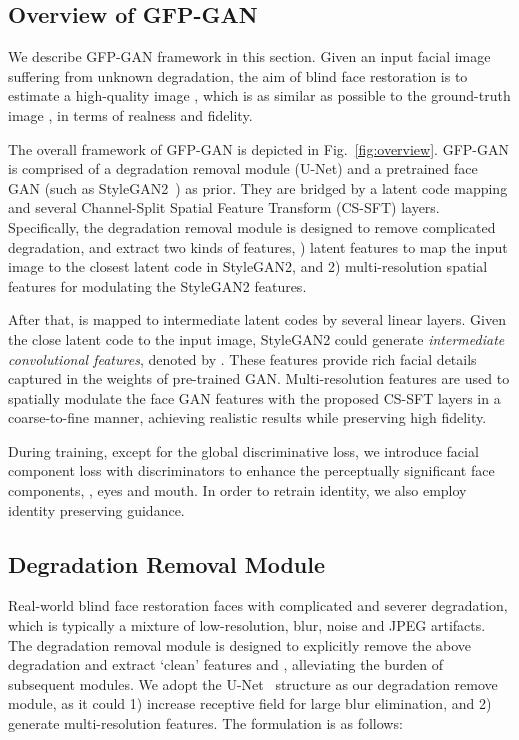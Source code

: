 \documentclass[final]{cvpr}
\begin{document}
\subsection{Overview of GFP-GAN}
We describe GFP-GAN framework in this section. Given an input facial image  suffering from unknown degradation, the aim of blind face restoration is to estimate a high-quality image , which is as similar as possible to the ground-truth image , in terms of realness and fidelity.

The overall framework of GFP-GAN is depicted in Fig.~\ref{fig:overview}. GFP-GAN is comprised of a degradation removal module (U-Net) and a pretrained face GAN (such as StyleGAN2~\cite{karras2020stylegan2}) as prior. They are bridged by a latent code mapping and several Channel-Split Spatial Feature Transform (CS-SFT) layers. 
Specifically, the degradation removal module is designed to remove complicated degradation, and extract two kinds of features, ) latent features  to map the input image to the closest latent code in StyleGAN2, and 2) multi-resolution spatial features  for modulating the StyleGAN2 features. 

After that,  is mapped to intermediate latent codes  by several linear layers. Given the close latent code to the input image, StyleGAN2 could generate \textit{intermediate convolutional features}, denoted by . These features provide rich facial details captured in the weights of pre-trained GAN.
Multi-resolution features  are used to spatially modulate the face GAN features  with the proposed CS-SFT layers in a coarse-to-fine manner, achieving realistic results while preserving high fidelity.

During training, except for the global discriminative loss, we introduce facial component loss with discriminators to enhance the perceptually significant face components, \ie, eyes and mouth. In order to retrain identity, we also employ identity preserving guidance. 


\subsection{Degradation Removal Module}
\label{method:degradation_removal}
Real-world blind face restoration faces with complicated and severer degradation, which is typically a mixture of low-resolution, blur, noise and JPEG artifacts. 
The degradation removal module is designed to explicitly remove the above degradation and extract `clean' features  and , alleviating the burden of subsequent modules.
We adopt the U-Net~\cite{ronneberger2015unet} structure as our degradation remove module, as it could 1) increase receptive field for large blur elimination, and 2) generate multi-resolution features.
The formulation is as follows:
\end{document}
